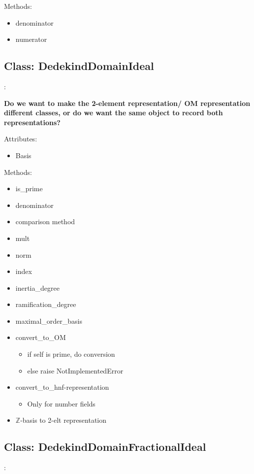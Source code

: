 \documentclass{amsart}
\theoremstyle{definition}
\begin{document}
	Methods:
	\begin{itemize}
		\item
		denominator
		\item
		numerator
	\end{itemize}

	\subsection{Class: DedekindDomainIdeal}: \newline
	
	{\bf Do we want to make the 2-element representation/ OM representation different classes, or do we want the same object to record both representations?} \newline
	
	Attributes:
	\begin{itemize}
		\item 
		Basis
	\end{itemize}
	
	Methods:
	\begin{itemize}
		\item
		is\_prime
		\item
		denominator
		\item
		comparison method
		\item
		mult
		\item
		norm
		\item
		index
		\item
		inertia\_degree
		\item
		ramification\_degree
		\item
		maximal\_order\_basis
		\item
		convert\_to\_OM
			\begin{itemize}
				\item 
				if self is prime, do conversion
				\item
				else raise NotImplementedError
			\end{itemize}
		\item
		convert\_to\_hnf-representation
			\begin{itemize}
				\item 
				Only for number fields
			\end{itemize}
		\item
		$\mathbb{Z}$-basis to 2-elt representation
	\end{itemize}

	\subsection{Class: DedekindDomainFractionalIdeal}: \newline
	
\end{document}
